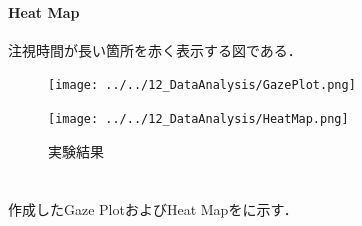 \paragraph{Heat Map}
注視時間が長い箇所を赤く表示する図である．

\begin{figure}
    \centering
    \begin{minipage}[b]{.2\textwidth}
        \centering
        \texttt{[image: ../../12\_DataAnalysis/GazePlot.png]}
    \end{minipage}
    \begin{minipage}[b]{.2\textwidth}
        \centering
        \texttt{[image: ../../12\_DataAnalysis/HeatMap.png]}
    \end{minipage}
    \caption{\kadaid 実験結果}
    \label{fig:実験結果\kadaid}
\end{figure}
\section{\result}
作成したGaze PlotおよびHeat Mapをに示す．
\section{\consideration}
